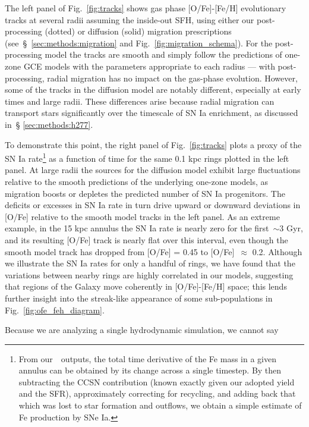 \documentclass[draft2.tex]{subfiles}
\begin{document}
The left panel of Fig.~\ref{fig:tracks} shows gas phase [O/Fe]-[Fe/H] 
evolutionary tracks at several radii assuming the inside-out SFH, using either 
our post-processing (dotted) or diffusion (solid) migration prescriptions 
(see~\S~\ref{sec:methods:migration} and Fig.~\ref{fig:migration_schema}). 
For the post-processing model the tracks are smooth and simply follow the 
predictions of one-zone GCE models with the parameters appropriate to each 
radius --- with post-processing, radial migration has no impact on the gas-phase 
evolution. 
However, some of the tracks in the diffusion model are notably 
different, especially at early times and large radii. 
These differences arise because radial migration can transport stars 
significantly over the timescale of SN Ia enrichment, as discussed in~\S 
\ref{sec:methods:h277}.
\par 
To demonstrate this point, the right panel of Fig.~\ref{fig:tracks} plots a 
proxy of the SN Ia rate\footnote{
	From our~\vice~outputs, the total time derivative of the Fe mass in a given 
	annulus can be obtained by its change across a single timestep. By then 
	subtracting the CCSN contribution (known exactly given our adopted yield 
	and the SFR), approximately correcting for recycling, and adding back that 
	which was lost to star formation and outflows, we obtain a simple estimate 
	of Fe production by SNe Ia. 
} as a function of time for the same 0.1 kpc rings plotted in the left panel. 
At large radii the sources for the diffusion model exhibit large fluctuations 
relative to the smooth predictions of the underlying one-zone models, as 
migration boosts or depletes the predicted number of SN Ia progenitors. 
The deficits or excesses in SN Ia rate in turn drive upward or downward 
deviations in [O/Fe] relative to the smooth model tracks in the left panel. 
As an extreme example, in the 15 kpc annulus the SN Ia rate is nearly zero for 
the first~$\sim$3 Gyr, and its resulting [O/Fe] track is nearly flat over this 
interval, even though the smooth model track has dropped from [O/Fe] = 0.45 to 
[O/Fe]~$\approx$ 0.2. 
Although we illustrate the SN Ia rates for only a handful of rings, we have 
found that the variations between nearby rings are highly correlated in our 
models, suggesting that regions of the Galaxy move coherently in 
[O/Fe]-[Fe/H] space; this lends further insight into the streak-like appearance 
of some sub-populations in Fig.~\ref{fig:ofe_feh_diagram}. 
\par 
Because we are analyzing a single hydrodynamic simulation, we cannot say 
\end{document}
